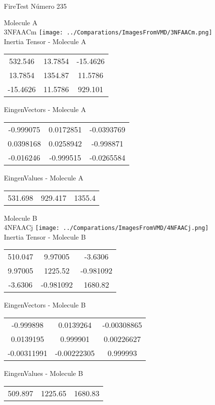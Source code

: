 \vtab[-2cm]
\begin{center}
{\large FireTest \tab Número 235}
\end{center}
\begin{multicols}{2}
\begin{center}

Molecule A \\ 
3NFAACm
\texttt{[image: ../Comparations/ImagesFromVMD/3NFAACm.png]}
\\
Inertia Tensor - Molecule A \\
\vtab

\begin{tabular}{|c c c|}
532.546	 & 	13.7854	 & 	-15.4626	 \\
13.7854	 & 	1354.87	 & 	11.5786	 \\
-15.4626	 & 	11.5786	 & 	929.101
\end{tabular}

\vtab
 EingenVectors - Molecule A     \\
\vtab
\begin{tabular}{|c c c|}
-0.999075	 & 	0.0172851	 & 	-0.0393769	 \\
0.0398168	 & 	0.0258942	 & 	-0.998871	 \\
-0.016246	 & 	-0.999515	 & 	-0.0265584
\end{tabular}

\vtab
 EingenValues - Molecule A     \\
\vtab
\begin{tabular}{|c c c|}
531.698	 & 	929.417	 & 	1355.4	 \\
\end{tabular}
\columnbreak

Molecule B \\ 
4NFAACj
\texttt{[image: ../Comparations/ImagesFromVMD/4NFAACj.png]}
\\
Inertia Tensor - Molecule B \\
\vtab

\begin{tabular}{|c c c|}
510.047	 & 	9.97005	 & 	-3.6306	 \\
9.97005	 & 	1225.52	 & 	-0.981092	 \\
-3.6306	 & 	-0.981092	 & 	1680.82
\end{tabular}

\vtab
 EingenVectors - Molecule B     \\
\vtab
\begin{tabular}{|c c c|}
-0.999898	 & 	0.0139264	 & 	-0.00308865	 \\
0.0139195	 & 	0.999901	 & 	0.00226627	 \\
-0.00311991	 & 	-0.00222305	 & 	0.999993
\end{tabular}

\vtab
 EingenValues - Molecule B     \\
\vtab
\begin{tabular}{|c c c|}
509.897	 & 	1225.65	 & 	1680.83	 \\
\end{tabular}

\end{center}
\end{multicols}
